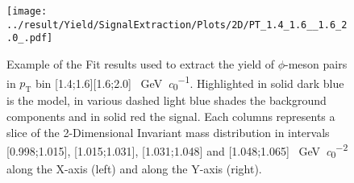 \begin{figure}
\centering
\texttt{[image: ../result/Yield/SignalExtraction/Plots/2D/PT\_1.4\_1.6\_\_1.6\_2.0\_.pdf]}
\caption{Example of the Fit results used to extract the yield of $\phi$-meson pairs in $p_{\text{T}}$ bin [1.4;1.6][1.6;2.0] \SI{}{\giga\electronvolt \per \clight}. Highlighted in solid dark blue is the model, in various dashed light blue shades the background components and in solid red the signal. Each columns represents a slice of the 2-Dimensional Invariant mass distribution in intervals [0.998;1.015], [1.015;1.031], [1.031;1.048] and [1.048;1.065] \SI{}{\giga\electronvolt \per \clight \squared} along the X-axis (left) and along the Y-axis (right).}
\label{fig:2Dfit}
\end{figure}
